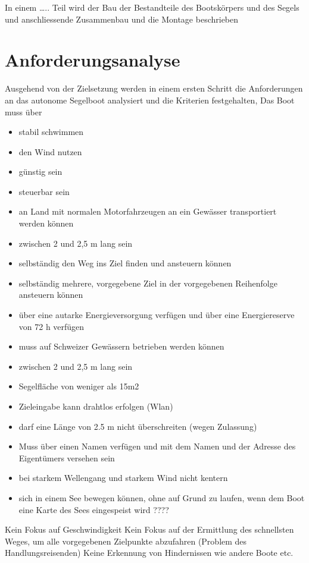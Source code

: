  In einem ….. Teil wird der Bau der Bestandteile des Bootskörpers und des Segels und anschliessende Zusammenbau und die Montage beschrieben 

\section{Anforderungsanalyse}
Ausgehend von der Zielsetzung werden in einem ersten Schritt die Anforderungen an das autonome Segelboot analysiert und die Kriterien festgehalten, Das Boot muss über
\begin{itemize}
    \item stabil schwimmen
    \item den Wind nutzen
    \item günstig sein
    \item steuerbar sein
    \item an Land mit normalen Motorfahrzeugen an ein Gewässer transportiert werden können
    \item zwischen 2 und 2,5 m lang sein
    \item selbständig den Weg ins Ziel finden und ansteuern können
    \item selbständig mehrere, vorgegebene Ziel in der vorgegebenen Reihenfolge ansteuern können
    \item über eine autarke Energieversorgung verfügen und über eine Energiereserve von 72 h verfügen 
    \item muss auf Schweizer Gewässern betrieben werden können
    \item zwischen 2 und 2,5 m lang sein
    \item Segelfläche von weniger als 15m2
    \item Zieleingabe kann drahtlos erfolgen (Wlan)
    \item     darf eine Länge von 2.5 m nicht überschreiten (wegen Zulassung)
    \item Muss über einen Namen verfügen und mit dem Namen und der Adresse des Eigentümers versehen sein 
    \item bei starkem Wellengang und starkem Wind nicht kentern
    \item sich in einem See bewegen können, ohne auf Grund zu laufen, wenn dem Boot eine Karte des Sees eingespeist wird ????
\end{itemize}

Kein Fokus auf Geschwindigkeit
Kein Fokus auf der Ermittlung des schnellsten Weges, um alle vorgegebenen Zielpunkte abzufahren (Problem des Handlungsreisenden)
Keine Erkennung von Hindernissen wie andere Boote etc.
 

